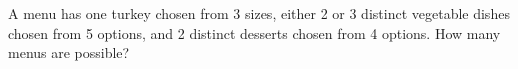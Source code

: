 A menu has one turkey chosen from 3 sizes, either 2 or 3 distinct vegetable dishes chosen from 5 options, and 2 distinct desserts chosen from 4 options. How many menus are possible?
